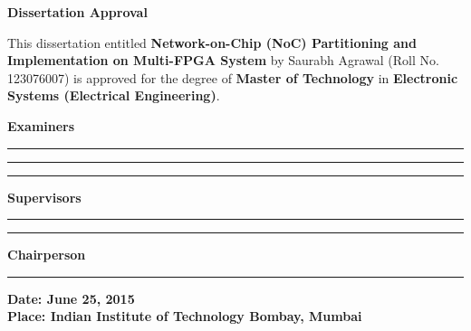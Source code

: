 \newpage
\thispagestyle{empty}
\begin{center}
\large{\huge{\textbf{Dissertation Approval}}}\\
\vspace*{1cm}

\singlespace
\begin{minipage}[t][5cm][s]{\textwidth} 
This dissertation entitled \textbf{Network-on-Chip (NoC) Partitioning and Implementation on Multi-FPGA System} by Saurabh Agrawal (Roll No. 123076007) is approved for the degree of \textbf{Master of Technology} in \textbf{Electronic Systems (Electrical Engineering)}.
\end{minipage}
\vfill
\begin{flushright}
\textbf{Examiners}\hspace{2cm}

\vspace{1cm}

\rule[1em]{15em}{0.5pt}

\vspace{1cm}

\rule[1em]{15em}{0.5pt}

\vspace{1cm}

\rule[1em]{15em}{0.5pt}

\vspace{1cm}

\textbf{Supervisors}\hspace{2cm}

\vspace{1cm}

\rule[1em]{15em}{0.5pt}

\vspace{1cm}

\rule[1em]{15em}{0.5pt}

\vspace{1cm}

\textbf{Chairperson}\hspace{1.8cm}

\vspace{1cm}

\rule[1em]{15em}{0.5pt}

\end{flushright}
\begin{flushleft}
\textbf{Date: June 25, 2015}\\ 

\textbf{Place: Indian Institute of Technology Bombay, Mumbai}\\
\vfill \vfill
\end{flushleft}
\end{center}
